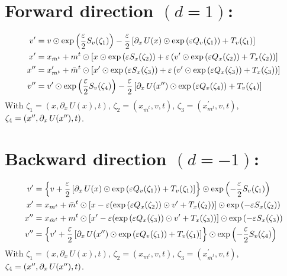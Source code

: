 \documentclass[main.tex]{subfiles}
\begin{document}
%
%
\section{Forward direction \texorpdfstring{$(d = 1)$}{(d = 1)}:}%
\label{sec:lf_forward}
\begin{align}
  \vp &= v \odot \exp{\left(\frac{\eps}{2}S_{v}(\zeta_{1})\right)}%
        - \frac{\eps}{2}\left[\partial_{x}\,U(x)\odot \exp{\left(\eps Q_{v}(\zeta_{1})\right)}%
        + T_{v}(\zeta_{1})\right] \\
  \xp &= x_{\bar{m}^{t}} + m^{t}\odot \left[x \odot \exp{\left(\eps S_{x}(\zeta_{2})\right)}%
        + \eps\left(\vp\odot\exp{\left(\eps Q_{x}(\zeta_{2})\right)} + T_{x}(\zeta_{2})\right)\right] \\
  \xpp &= x^{\prime}_{m^{t}} + \bar{m}^{t}\odot \left[\xp \odot \exp{\left(\eps S_{x}(\zeta_{3})\right)}%
        + \eps\left(\vp\odot\exp{\left(\eps Q_{x}(\zeta_{3})\right)} + T_{x}(\zeta_{3})\right)\right] \\
  \vpp &= \vp \odot \exp{\left(\frac{\eps}{2}S_{v}(\zeta_{4})\right)}%
        - \frac{\eps}{2}\left[\partial_{x}\,U(\xpp)\odot \exp{\left(\eps Q_{v}(\zeta_{4})\right)}%
          + T_{v}(\zeta_{4})\right]
\end{align} 
%
With $\zeta_{1} = (x, \partial_{x}\, U(x), t)$, $\zeta_{2} = (x_{\bar{m}^{t}}, v, t)$, $\zeta_{3} =
(x^{\prime}_{m^{t}}, v, t)$, $\zeta_{4} = ({x^{\prime\prime}}, \partial_{x}\, U({x^{\prime\prime}}), t)$.
%
\section{Backward direction \texorpdfstring{$(d = -1)$}{(d = -1)}:}%
\label{sec:lf_backward}
%
\begin{align}
  v^{\prime} &= {\left\{v + \frac{\eps}{2}\left[\partial_{x}\,U(x)\odot \exp{\left(\eps Q_{v}(\zeta_{1})\right)}%
    + T_{v}(\zeta_{1})\right]\right\}} \odot \exp{\left(-\frac{\eps}{2}S_{v}(\zeta_{1})\right)} \\
  \xp &= x_{m^{t}} + \bar{m}^{t}\odot%
    {\left[x - \eps{\left(\exp{\left(\eps Q_{x}(\zeta_{2})\right)}\odot \vp%
    + T_{x}(\zeta_{2})\right)}\right]}\odot \exp{\left(-\eps S_{x}(\zeta_{2})\right)} \\
  \xpp &= x_{\bar{m}^{t}} + m^{t}\odot%
    {\left[\xp - \eps{\left(\exp{\left(\eps Q_{x}(\zeta_{3})\right)}\odot \vp%
    + T_{x}(\zeta_{3})\right)}\right]}\odot \exp{\left(-\eps S_{x}(\zeta_{3})\right)} \\
  v^{\prime\prime} &= {\left\{\vp + \frac{\eps}{2}\left[\partial_{x}\,U(\xpp)\odot%
    \exp{\left(\eps Q_{v}(\zeta_{1})\right)}
    + T_{v}(\zeta_{1})\right]\right\}}\odot 
    \exp{\left(-\frac{\eps}{2}S_{v}(\zeta_{4})\right)}
\end{align}
%
With $\zeta_{1} = (x, \partial_{x}\, U(x), t)$, $\zeta_{2} = (x_{m^{t}}, v, t)$, $\zeta_{3} =
(x^{\prime}_{\bar{m}^{t}}, v, t)$, $\zeta_{4} = ({x^{\prime\prime}}, \partial_{x}\, U({x^{\prime\prime}}), t)$.
%
\end{document}
